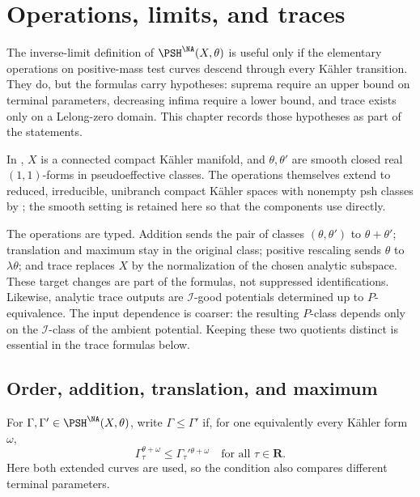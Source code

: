 \chapter{Operations, limits, and traces}
\label{chap:operations-trace}

The inverse-limit definition of
$\PSH^{\NA}(X,\theta)$ is useful only if the elementary operations on
positive-mass test curves descend through every K\"ahler transition.
They do, but the formulas carry hypotheses: suprema require an upper
bound on terminal parameters, decreasing infima require a lower bound,
and trace exists only on a Lelong-zero domain.  This chapter records
those hypotheses as part of the statements.

In ,
$X$ is a connected compact K\"ahler manifold, and
$\theta,\theta'$ are smooth closed real $(1,1)$-forms in
pseudoeffective classes.
The operations themselves extend to reduced, irreducible, unibranch
compact K\"ahler spaces with nonempty psh classes by
\cite{XiaOperationsV3}; the smooth setting is retained here so that the
components use  directly.

The operations are typed.  Addition sends the pair of classes
$(\theta,\theta')$ to $\theta+\theta'$; translation and maximum stay
in the original class; positive rescaling sends $\theta$ to
$\lambda\theta$; and trace replaces $X$ by the normalization of the
chosen analytic subspace.  These target changes are part of the formulas,
not suppressed identifications.  Likewise, analytic trace outputs are
$\mathcal I$-good potentials determined up to $P$-equivalence.  The
input dependence is coarser: the resulting $P$-class depends only on the
$\mathcal I$-class of the ambient potential.  Keeping these two
quotients distinct is essential in the trace formulas below.

\section{Order, addition, translation, and maximum}
\label{sec:operations-basic}

\begin{definition}[Order]
\label{def:operations-order}
For $\Gamma,\Gamma'\in\PSH^{\NA}(X,\theta)$, write
$\Gamma\leq\Gamma'$ if, for one equivalently every K\"ahler form
$\omega$,
\[
 \Gamma_\tau^{\theta+\omega}
 \leq\Gamma_\tau'{}^{\theta+\omega}
 \quad\text{for all }\tau\in\mathbf R.
\tag{54.1}\label{eq:operations-order}
\]
Here both extended curves are used, so the condition also compares
different terminal parameters.
\end{definition}

